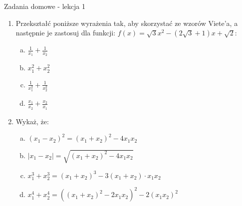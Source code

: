 \documentclass[12pt,a4paper]{article}
\begin{document}
	\begin{center}
		\LARGE Zadania domowe - lekcja 1
	\end{center}
	\vspace{1.5cm}
	
	\begin{enumerate}[1.]
		\item Przekształć poniższe wyrażenia tak, aby skorzystać ze wzorów Viete'a, a następnie je zastosuj dla funkcji: $f(x)=\sqrt{3}x^2-(2\sqrt{3}+1)x+\sqrt{2}$:
		
		\begin{enumerate}[a)]
			\item $\frac{1}{x_1}+\frac{1}{x_2}$
			\item $x_1^2+x_2^2$
			\item $\frac{1}{x_1^2}+\frac{1}{x_2^2}$
			\item $\frac{x_1}{x_2}+\frac{x_2}{x_1}$
		\end{enumerate}
	
		\item Wykaż, że:
		\begin{enumerate}[a)]
			\item $(x_1-x_2)^2=(x_1+x_2)^2-4x_1x_2$
			\item $|x_1-x_2|=\sqrt{(x_1+x_2)^2-4x_1x_2}$
			\item $x_1^3+x_2^3=(x_1+x_2)^3-3(x_1+x_2)\cdot x_1x_2$
			\item $x_1^4+x_2^4=((x_1+x_2)^2-2x_1x_2)^2-2(x_1x_2)^2$
		\end{enumerate}
	\end{enumerate}
	
	
	
\end{document}
